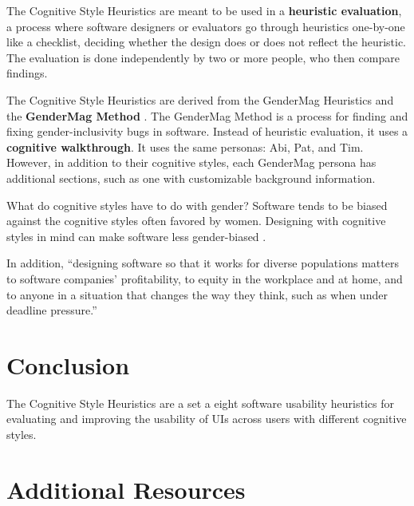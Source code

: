 \marginpar{\heuristicEvaluationDef\margindivider}


\marginpar{\genderMagMethodDef\margindivider}

\marginpar{\cognitiveWalkthroughDef}

The Cognitive Style Heuristics are meant to be used in a \textbf{heuristic evaluation}, a process where software designers or evaluators go through heuristics one-by-one like a checklist, deciding whether the design does or does not reflect the heuristic. The evaluation is done independently by two or more people, who then compare findings.

The Cognitive Style Heuristics are derived from the GenderMag Heuristics \parencite{gendermagheuristics} and the \textbf{GenderMag Method} \parencite{burnett16}. The GenderMag Method is a process for finding and fixing gender-inclusivity bugs in software. Instead of heuristic evaluation, it uses a \textbf{cognitive walkthrough}. It uses the same personas: Abi, Pat, and Tim. However, in addition to their cognitive styles, each GenderMag persona has additional sections, such as one with customizable background information.

What do cognitive styles have to do with gender? Software tends to be biased against the cognitive styles often favored by women. Designing with cognitive styles in mind can make software less gender-biased \parencite{vorvoreanu19}.

In addition, ``designing software so that it works for diverse populations matters to software companies’ profitability, to equity in the workplace and at home, and to anyone in a situation that changes the way they think, such as when under deadline pressure.''\parencite{mendez19}

\section{Conclusion}

The Cognitive Style Heuristics are a set a eight software usability heuristics for evaluating and improving the usability of UIs across users with different cognitive styles.

\nomargins
\section{Additional Resources}

